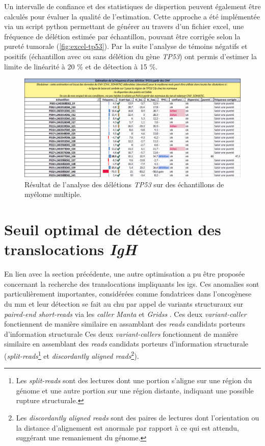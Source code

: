 Un intervalle de confiance et des statistiques de dispertion peuvent également être calculés pour évaluer la qualité de l'estimation. Cette 
approche a été implémentée via un script python permettant de générer au travers d'un fichier excel, une fréquence de délétion estimée par échantillon,
pouvant être corrigée selon la pureté tumorale (\autoref{fig:excel-tp53}). Par la suite l'analyse de témoins négatifs et positifs 
(échantillon avec ou sans délétion du gène \textit{TP53}) ont permis d'estimer la limite de linéarité à 20 \% et de détection à 15 \%.

\begin{figure}[H]
    \centering
    \includegraphics[width=1\textwidth]{images/excel_tp53.png}
    \caption{Résultat de l'analyse des délétions \textit{TP53} sur des échantillons de myélome multiple.}
    \label{fig:excel-tp53}
\end{figure}

\section{Seuil optimal de détection des translocations \textit{IgH}}

En lien avec la section précédente, une autre optimisation a pu être proposée concernant la recherche des translocations impliquants les \glspl{ig}.
Ces anomalies sont particulièrement importantes, considérées comme fondatrices dans l'oncogènese du \gls{mm} et leur détection se fait au \gls{chu} 
par appel de variants structuraux sur \textit{paired-end short-reads} via les \textit{caller} \textit{Manta} \cite{chenMantaRapidDetection2016a} et 
\textit{Gridss} \cite{cameronGRIDSSSensitiveSpecific2017a}. Ces deux \textit{variant-caller} fonctiennent de manière similaire en assamblant des \textit{reads} 
candidats porteurs d'information structurale Ces deux \textit{variant-callers} fonctionnent de manière similaire en assemblant des \textit{reads} candidats
porteurs d'information structurale (\textit{split-reads}\footnote{Les \textit{split-reads} sont des lectures dont une portion s'aligne sur une région du génome 
et une autre portion sur une région distante, indiquant une possible rupture structurale.} et \textit{discordantly aligned reads}\footnote{Les \textit{discordantly aligned reads} 
sont des paires de lectures dont l'orientation ou la distance d'alignement est anormale par rapport à ce qui est attendu, suggérant une remaniement du génome.}).


